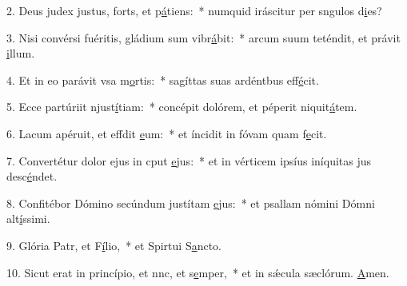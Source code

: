 2. Deus judex justus, forts, et p\uline{á}tiens:~* numquid iráscitur per sngulos d\uline{i}es?\par 
3. Nisi convérsi fuéritis, gládium sum vibr\uline{á}bit:~* arcum suum teténdit, et právit \uline{i}llum.\par 
4. Et in eo parávit vsa m\uline{o}rtis:~* sagíttas suas ardéntbus eff\uline{é}cit.\par 
5. Ecce partúriit njust\uline{í}tiam:~* concépit dolórem, et péperit niquit\uline{á}tem.\par 
6. Lacum apéruit, et effdit \uline{e}um:~* et íncidit in fóvam quam f\uline{e}cit.\par 
7. Convertétur dolor ejus in cput \uline{e}jus:~* et in vérticem ipsíus iníquitas jus desc\uline{é}ndet.\par 
8. Confitébor Dómino secúndum justítam \uline{e}jus:~* et psallam nómini Dómni alt\uline{í}ssimi.\par 
9. Glória Patr, et F\uline{í}lio,~* et Spirtui S\uline{a}ncto.\par 
10. Sicut erat in princípio, et nnc, et s\uline{e}mper,~* et in sǽcula sæclórum. \uline{A}men.\par 
